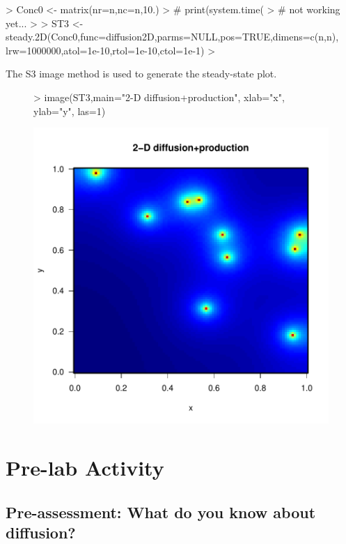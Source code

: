 \documentclass{tufte-handout}
\begin{document}
\begin{Schunk}
\begin{Sinput}
> Conc0 <- matrix(nr=n,nc=n,10.)
> # print(system.time(
> # not working yet...
> 
> ST3 <- steady.2D(Conc0,func=diffusion2D,parms=NULL,pos=TRUE,dimens=c(n,n), lrw=1000000,atol=1e-10,rtol=1e-10,ctol=1e-1)
> 
\end{Sinput}
\end{Schunk}


The S3 image method is used to generate the steady-state plot.

\begin{figure}
\begin{Schunk}
\begin{Sinput}
> image(ST3,main="2-D diffusion+production", xlab="x", ylab="y", las=1)
\end{Sinput}
\end{Schunk}
\includegraphics{AdvectionDiffusionProject-CreateImage}
\end{figure}
\section{Pre-lab Activity}

\subsection{Pre-assessment: What do you know about diffusion?}
\end{document}
